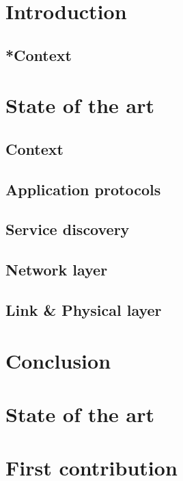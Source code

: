 \documentclass[8pt]{beamer}
\begin{document}
\firstpage

\section{Introduction}
		\subsection{*Context}
		

\tableofcontent

	\section{State of the art}
		\subsection*{Context}
			
		\subsection{Application protocols}
		\subsection{Service discovery}
		\subsection{Network layer}
		\subsection{Link \& Physical layer}
	\section{Conclusion}
		

\section{State of the art}
		
		

\section{First contribution}
		
		
		
		
		
		
\end{document}
